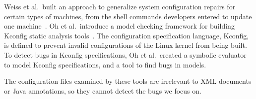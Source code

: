 Weiss et al.~built an approach to generalize system configuration repairs for certain types of machines, from the shell commands developers entered to update one machine~\cite{Weiss:2017:TIS}. 
Oh et al.~introduce a model checking framework for building Kconfig static analysis tools~\cite{Oh2021}. The configuration specification language, Kconfig, is defined to prevent invalid configurations of the Linux kernel from being built. %
To detect bugs in Kconfig specifications, Oh et al.~created a symbolic evaluator  to model Kconfig specifications, and a tool to find bugs in  models. 

The configuration files examined by these tools are irrelevant to XML documents or Java annotations, so they cannot detect the bugs we  focus on. 
